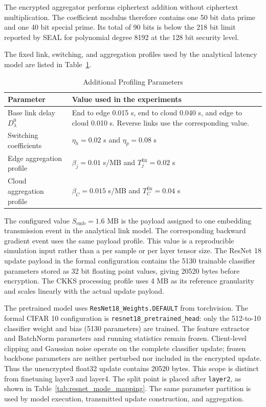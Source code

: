 \documentclass[5p,times]{elsarticle}
\theoremstyle{plain}
\theoremstyle{definition}
\theoremstyle{remark}
\newcommand{\tabref}[1]{Table~\ref{#1}}
\begin{document}
The encrypted aggregator performs ciphertext addition without ciphertext
multiplication. The coefficient modulus therefore contains one 50 bit data
prime and one 40 bit special prime. Its total of 90 bits is below the 218 bit
limit reported by SEAL for polynomial degree 8192 at the 128 bit security
level.

The fixed link, switching, and aggregation profiles used by the analytical
latency model are listed in \tabref{tab:additional_profile_params}.
\begin{table}[t]
\centering
\caption{Additional Profiling Parameters}
\label{tab:additional_profile_params}
\small
\setlength{\tabcolsep}{4pt}
\begin{tabularx}{\columnwidth}{@{}lX@{}}
\hline
\textbf{Parameter} & \textbf{Value used in the experiments} \\
\hline
Base link delay \(D_{\lambda}^{0}\) & End to edge 0.015 s, end to cloud 0.040 s, and edge to cloud 0.010 s. Reverse links use the corresponding value. \\
Switching coefficients & \(\eta_h=0.02\) s and \(\eta_p=0.08\) s \\
Edge aggregation profile & \(\beta_j=0.01\) s/MB and \(T_j^{\mathrm{fix}}=0.02\) s \\
Cloud aggregation profile & \(\beta_C=0.015\) s/MB and \(T_C^{\mathrm{fix}}=0.04\) s \\
\hline
\end{tabularx}
\end{table}

The configured value \(S_{\mathrm{emb}}=1.6\) MB is the payload assigned to
one embedding transmission event in the analytical link model. The
corresponding backward gradient event uses the same payload profile. This value
is a reproducible simulation input rather than a per sample or per layer tensor
size.
The ResNet 18 update payload in the formal configuration contains the 5130
trainable classifier parameters stored as 32 bit floating point values, giving
20520 bytes before encryption. The CKKS processing profile uses 4 MB as its
reference granularity and scales linearly with the actual update payload.

The pretrained model uses \texttt{ResNet18\_Weights.DEFAULT} from torchvision.
The formal CIFAR 10 configuration is \texttt{resnet18\_pretrained\_head}:
only the 512-to-10 classifier weight and bias (5130 parameters) are trained.
The feature extractor and BatchNorm parameters and running statistics remain frozen.
Client-level clipping and Gaussian noise operate on the complete classifier update;
frozen backbone parameters are neither perturbed nor included in the encrypted update.
Thus the unencrypted float32 update contains 20520 bytes. This scope is distinct
from finetuning layer3 and layer4. The
split point is placed after \texttt{layer2}, as shown in
\tabref{tab:resnet_mode_mapping}. The same parameter partition is used by model
execution, transmitted update construction, and aggregation.
\end{document}
